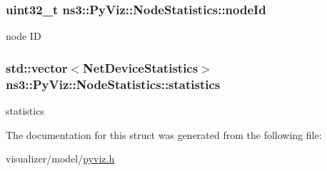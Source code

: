 \subsubsection[{\texorpdfstring{node\+Id}{nodeId}}]{\setlength{\rightskip}{0pt plus 5cm}uint32\+\_\+t ns3\+::\+Py\+Viz\+::\+Node\+Statistics\+::node\+Id}\hypertarget{structns3_1_1PyViz_1_1NodeStatistics_a400ac6506760da840f6239363411d6da}{}\label{structns3_1_1PyViz_1_1NodeStatistics_a400ac6506760da840f6239363411d6da}


node ID 

\subsubsection[{\texorpdfstring{statistics}{statistics}}]{\setlength{\rightskip}{0pt plus 5cm}std\+::vector$<${\bf Net\+Device\+Statistics}$>$ ns3\+::\+Py\+Viz\+::\+Node\+Statistics\+::statistics}\hypertarget{structns3_1_1PyViz_1_1NodeStatistics_a2ba3435c3db3286d685dd8a59db6285a}{}\label{structns3_1_1PyViz_1_1NodeStatistics_a2ba3435c3db3286d685dd8a59db6285a}


statistics 



The documentation for this struct was generated from the following file\+:\begin{DoxyCompactItemize}
\item 
visualizer/model/\hyperlink{pyviz_8h}{pyviz.\+h}\end{DoxyCompactItemize}
